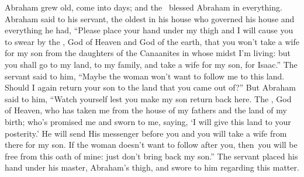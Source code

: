 
\begin{inparaenum}
   Abraham grew old, come into days; and the \lord\ blessed Abraham in everything.%
   Abraham said to his servant, the oldest in his house who governed his house and everything he had, ``Please place your hand under my thigh%
   and I will cause you to swear by the \lord, God of Heaven and God of the earth, that you won't take a wife for my son from the daughters of the Canaanites in whose midst I'm living:%
   but you shall go to my land, to my family, and take a wife for my son, for Isaac.''%
   The servant said to him, ``Maybe the woman won't want to follow me to this land. Should I again return your son to the land that you came out of?''%
   But Abraham said to him, ``Watch yourself lest you make my son return back here.%
   The \lord, God of Heaven, who has taken me from the house of my fathers and the land of my birth; who's promised me and sworn to me, saying, `I will give this land to your posterity.' He will send His messenger before you and you will take a wife from there for my son.%
   If the woman doesn't want to follow after you, then\understood\ you will be free from this oath of mine: just don't bring back my son.''%
   The servant placed his hand under his master, Abraham's thigh, and swore to him regarding this matter.%
  

\end{inparaenum}

